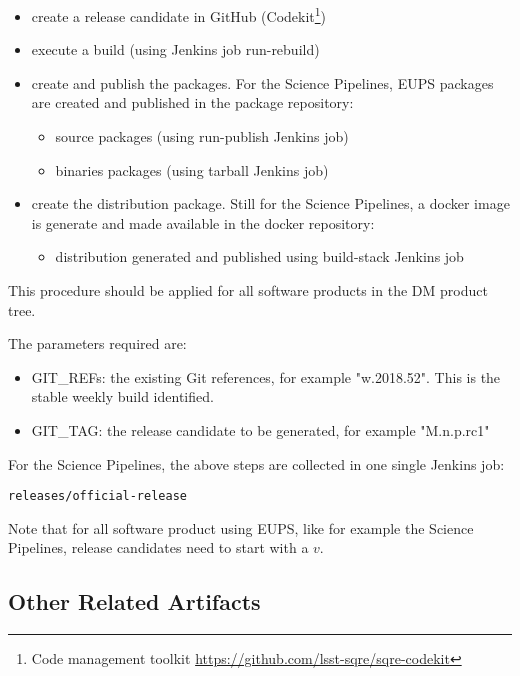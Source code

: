\begin{itemize}
\item create a release candidate in GitHub (Codekit\footnote{Code management toolkit \url{https://github.com/lsst-sqre/sqre-codekit}})
\item execute a build (using Jenkins job run-rebuild)
\item create and publish the packages. For the Science Pipelines, EUPS packages are created and published in the package repository:
   \begin{itemize}
   \item source packages (using run-publish Jenkins job)
   \item binaries packages (using tarball Jenkins job)
   \end{itemize}
\item create the distribution package. Still for the Science Pipelines, a docker image is generate and made available in the docker repository:
   \begin{itemize}
   \item distribution generated and published using build-stack Jenkins job
   \end{itemize}
\end{itemize}


This procedure should be applied for all software products in the DM product tree.

The parameters required are:
\begin{itemize}
\item GIT\_REFs: the existing Git references, for example "w.2018.52". This is the stable weekly build identified.
\item GIT\_TAG: the release candidate to be generated, for example "M.n.p.rc1"
\end{itemize}

For the Science Pipelines, the above steps are collected in one single Jenkins job:

\begin{verbatim}
releases/official-release
\end{verbatim}

Note that for all software product using EUPS, like for example the Science Pipelines, release candidates need to start with a $v$.

\subsection{Other Related Artifacts}

